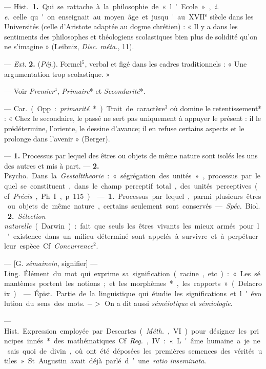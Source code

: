 \begin{itemize}[leftmargin=1cm, label=, itemsep=1pt]
 — \si{Hist.} {\bf 1.} Qui se rattache
à la philosophie de « l'Ecole », {\it i. e.}
celle qu'on enseignait au moyen âge et jusqu'au
{\footnotesize XVII}$^\text{e}$ siècle dans les Universités (celle d’Aristote
adaptée au dogme chrétien) : « Il y a dans les sentiments des philosophes et
théologiens scolastiques bien plus de solidité qu'on ne s'imagine » (Leibniz,
{\it Disc. méta.}, 11).

— {\it Ext.} {\bf 2.} ({\it Péj.}). Formel$^5$, verbal et figé dans les
cadres traditionnels : « Une argumentation trop scolastique. »

 — Voir {\it Premier}$^4$,
{\it Primaire}* et {\it Secondarité}*.

 — \si{Car.} (Opp. : {\it primarité}*). Trait de caractère$^3$
où domine le retentissement* : « Chez le secondaire, le passé ne sert pas
uniquement à appuyer le présent : il le prédétermine, l’oriente, le dessine
d'avance; il en refuse certains aspects et le prolonge dans
l’avenir » (Berger).

 — {\bf 1.} Processus par lequel des êtres ou objets de même
nature sont isolés les uns des autres et mis à part. — {\bf 2.} \si{Psycho.}
Dans la {\it Gestalttheorie} : « ségrégation des unités », processus par
lequel se constituent, dans le champ perceptif total, des unités perceptives
(cf. {\it Précis}, Ph. I, p. 115).

 — {\bf 1.} Processus par lequel, parmi plusieurs êtres ou
objets de même nature, certains seulement sont conservés.

— {\it Spéc.} \si{Biol.} {\bf 2.} {\it Sélection naturelle} (Darwin) : fait
que seuls les êtres vivants les mieux armés pour l'existence dans un milieu
déterminé sont appelés à survivre et à perpétuer leur espèce. Cf.
{\it Concurrence}$^2$.

 — [G. {\it sêmainein}, signifier] — \si{Ling.} Élément du
mot qui exprime sa signification (racine, etc.) : « Les
sémantèmes portent les notions; et les morphèmes*, les rapports »
(Delacroix).

 — \si{Épist.} Partie de la linguistique qui étudie les
significations et l'évolution du sens des mots. $->$ On a dit aussi
{\it séméiotique} et {\it sémiologie}.

 — \si{Hist.} Expression employée par Descartes
({\it Méth.}, VI) pour désigner les principes innés* des mathématiques. Cf.
{\it Reg.}, IV : « L'âme humaine a je ne sais quoi de divin, où ont été
déposées les premières semences des vérités utiles. » St. Augustin avait déjà
parlé d’une {\it ratio inseminata}.


\end{itemize}
